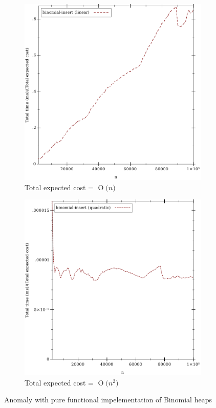 \documentclass{llncs}
\newcommand{\BigO}[1]{\ensuremath{\operatorname{O}\bigl(#1\bigr)}}
\begin{document}
\begin{figure}
	\begin{subfigure}{0.5\textwidth}
		\centering
		\includegraphics[width=0.8\linewidth]{FIG/insert_binomial_linear.pdf}
		\caption{Total expected cost = \BigO{n}}
		\label{fig:bino_anomaly_linear}
	\end{subfigure}%
	\begin{subfigure}{0.5\textwidth}
		\centering
		\includegraphics[width=0.8\linewidth]{FIG/insert_binomial_quad.pdf}
		\caption{Total expected cost = \BigO{n^2}}
		\label{fig:bino_anomaly_quad}
	\end{subfigure}
	\caption{Anomaly with pure functional impelementation of Binomial heaps}
	\label{fig:bino_anomaly}
\end{figure}
\end{document}
